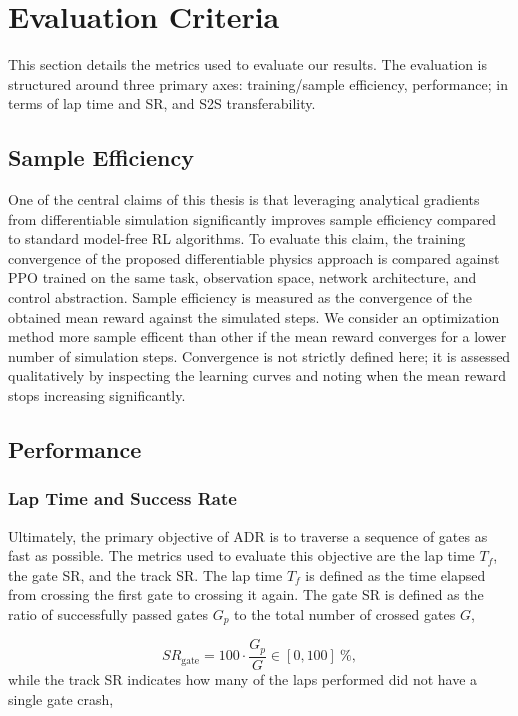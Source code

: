 \section{Evaluation Criteria}\label{sec:eval_criteria}

This section details the metrics used to evaluate our results. 
The evaluation is structured around three primary axes: training/sample efficiency, performance; in terms of lap time and \ac{SR}, and \ac{S2S} transferability. 

\subsection{Sample Efficiency}
One of the central claims of this thesis is that leveraging analytical gradients from differentiable simulation significantly improves sample efficiency compared to standard model-free \ac{RL} algorithms.
To evaluate this claim, the training convergence of the proposed differentiable physics approach is compared against \ac{PPO} trained on the same task, observation space, network architecture, and control abstraction.
Sample efficiency is measured as the convergence of the obtained mean reward against the simulated steps. 
We consider an optimization method more sample efficent than other if the mean reward converges for a lower number of simulation steps.
Convergence is not strictly defined here; it is assessed qualitatively by inspecting the learning curves and noting when the mean reward stops increasing significantly.

\subsection{Performance}
\subsubsection{Lap Time and Success Rate}

Ultimately, the primary objective of \ac{ADR} is to traverse a sequence of gates as fast as possible.
The metrics used to evaluate this objective are the lap time $T_f$, the gate \ac{SR}, and the track \ac{SR}.
The lap time $T_f$ is defined as the time elapsed from crossing the first gate to crossing it again.
The gate \ac{SR} is defined as the ratio of successfully passed gates $G_p$ to the total number of crossed gates $G$,

\begin{equation}
    \mathit{SR}_{\text{gate}} = 100\cdot\frac{G_p}{G} \in [0, 100]\ \%, 
\end{equation}
while the track \ac{SR} indicates how many of the laps performed did not have a single gate crash,

